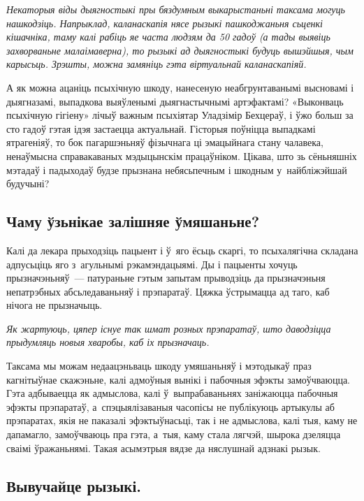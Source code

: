 \emph{Некаторыя віды дыягностыкі пры бяздумным выкарыстаньні таксама могуць нашкодзіць. Напрыклад, каланаскапія нясе рызыкі пашкоджаньня сьценкі кішачніка, таму калі рабіць яе часта людзям да 50 гадоў (а тады выявіць захворваньне малаімаверна), то рызыкі ад дыягностыкі будуць вышэйшыя, чым карысьць. Зрэшты, можна замяніць гэта віртуальнай каланаскапіяй.}

А як можна ацаніць псыхічную шкоду, нанесеную неабгрунтаванымі высновамі і дыягназамі, выпадкова выяўленымі дыягнастычнымі артэфактамі? «Выконваць псыхічную гігіену» лічыў важным псыхіятар Уладзімір Бехцераў, і ўжо больш за сто гадоў гэтая ідэя застаецца актуальнай. Гісторыя поўніцца выпадкамі ятрагеніяў, то бок пагаршэньняў фізычнага ці эмацыйнага стану чалавека, ненаўмысна справакаваных мэдыцынскім працаўніком. Цікава, што зь сёньняшніх мэтадаў і падыходаў будзе прызнана небясьпечным і шкодным у~найбліжэйшай будучыні? 


\subsection*{Чаму ўзьнікае залішняе ўмяшаньне?}

Калі да лекара прыходзіць пацыент і ў~яго ёсьць скаргі, то псыхалягічна складана адпусьціць яго з~агульнымі рэкамэндацыямі. Ды і пацыенты хочуць прызначэньняў~--- патураньне гэтым запытам прыводзіць да прызначэньня непатрэбных абсьледаваньняў і прэпаратаў. Цяжка ўстрымацца ад таго, каб нічога не прызначыць. 

\emph{Як жартуюць, цяпер існуе так шмат розных прэпаратаў, што даводзіцца прыдумляць новыя хваробы, каб іх прызначаць.}

Таксама мы можам недаацэньваць шкоду умяшаньняў і мэтодыкаў праз кагнітыўнае скажэньне, калі адмоўныя вынікі і пабочныя эфэкты замоўчваюцца. Гэта адбываецца як адмыслова, калі ў~выпрабаваньнях заніжаюцца пабочныя эфэкты прэпаратаў, а~спэцыялізаваныя часопісы не публікуюць артыкулы аб прэпаратах, якія не паказалі эфэктыўнасьці, так і не адмыслова, калі тыя, каму не дапамагло, замоўчваюць пра гэта, а~тыя, каму стала лягчэй, шырока дзеляцца сваімі ўражаньнямі. Такая асымэтрыя вядзе да няслушнай адзнакі рызык.

\subsection*{Вывучайце рызыкі.}

